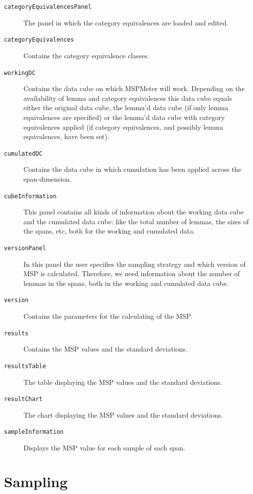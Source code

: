 \documentclass{article}
\begin{document}
\begin{description}
\item[\texttt{categoryEquivalencesPanel}] The panel in which the category equivalences are loaded and edited. 

\item[\texttt{categoryEquivalences}] Contains the category equivalence classes. 

\item[\texttt{workingDC}] Contains the data cube on which MSPMeter will work. Depending on the availability of lemma and category equivalences this data cube equals either the original data cube, the lemma'd data cube (if only lemma equivalences are specified) or the lemma'd data cube with category equivalences applied (if category equivalences, and possibly lemma equivalences, have been set).

\item[\texttt{cumulatedDC}] Contains the data cube in which cumulation has been applied across the span-dimension. 

\item[\texttt{cubeInformation}] This panel contains all kinds of information about the working data cube and the cumulated data cube: like the total number of lemmas, the sizes of the spans, etc, both for the working and cumulated data.

\item[\texttt{versionPanel}] In this panel the user specifies the sampling strategy and which version of MSP is calculated. Therefore, we need information about the number of lemmas in the spans, both in the working and cumulated data cube.

\item[\texttt{version}] Contains the parameters for the calculating of the MSP. 

\item[\texttt{results}] Contains the MSP values and the standard deviations. 

\item[\texttt{resultsTable}] The table displaying the MSP values and the standard deviations.

\item[\texttt{resultChart}] The chart displaying the MSP values and the standard deviations.

\item[\texttt{sampleInformation}] Displays the MSP value for each sample of each span.
\end{description}



\section{Sampling}
\end{document}

